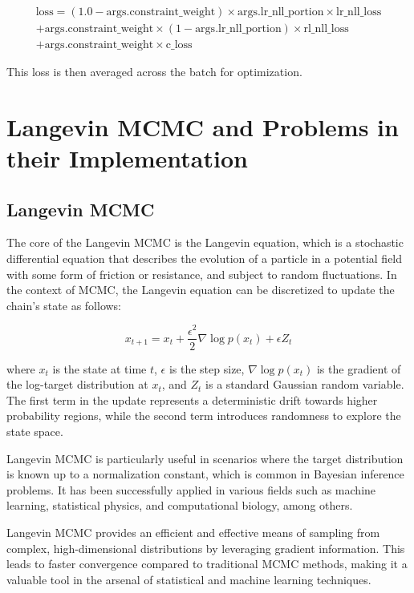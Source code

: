 \documentclass{article}
\begin{document}
\begin{multline*}
    \text{loss} = (1.0 - \text{args.constraint\_weight}) \times \text{args.lr\_nll\_portion} \times \text{lr\_nll\_loss} \\
    + \text{args.constraint\_weight} \times (1 - \text{args.lr\_nll\_portion}) \times \text{rl\_nll\_loss} \\
    + \text{args.constraint\_weight} \times \text{c\_loss}
\end{multline*}



This loss is then averaged across the batch for optimization.


\section{Langevin MCMC and Problems in their Implementation}
\subsection{Langevin MCMC}
The core of the Langevin MCMC is the Langevin equation, which is a stochastic differential equation that describes the evolution of a particle in a potential field with some form of friction or resistance, and subject to random fluctuations. In the context of MCMC, the Langevin equation can be discretized to update the chain's state as follows:

\begin{equation}
    x_{t+1} = x_t + \frac{\epsilon^2}{2} \nabla \log p(x_t) + \epsilon Z_t
\end{equation}

where $x_t$ is the state at time $t$, $\epsilon$ is the step size, $\nabla \log p(x_t)$ is the gradient of the log-target distribution at $x_t$, and $Z_t$ is a standard Gaussian random variable. The first term in the update represents a deterministic drift towards higher probability regions, while the second term introduces randomness to explore the state space.

Langevin MCMC is particularly useful in scenarios where the target distribution is known up to a normalization constant, which is common in Bayesian inference problems. It has been successfully applied in various fields such as machine learning, statistical physics, and computational biology, among others.

Langevin MCMC provides an efficient and effective means of sampling from complex, high-dimensional distributions by leveraging gradient information. This leads to faster convergence compared to traditional MCMC methods, making it a valuable tool in the arsenal of statistical and machine learning techniques.
\end{document}
